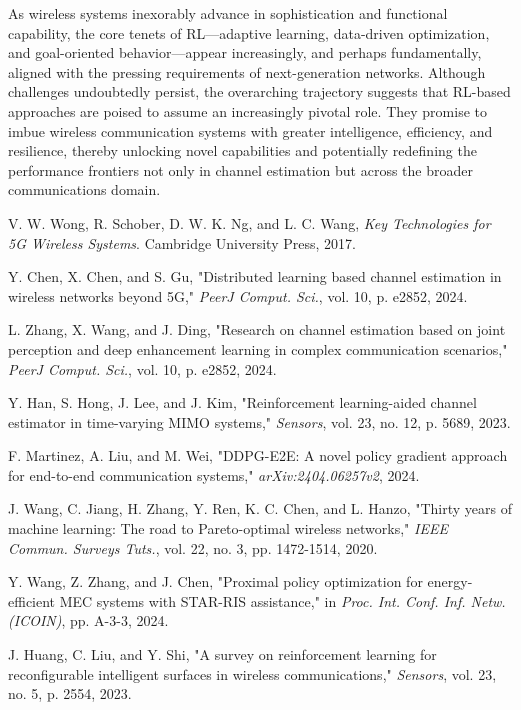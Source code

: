 \documentclass[journal,twocolumn]{IEEEtran}
\begin{document}
As wireless systems inexorably advance in sophistication and functional capability, the core tenets of RL—adaptive learning, data-driven optimization, and goal-oriented behavior—appear increasingly, and perhaps fundamentally, aligned with the pressing requirements of next-generation networks. Although challenges undoubtedly persist, the overarching trajectory suggests that RL-based approaches are poised to assume an increasingly pivotal role. They promise to imbue wireless communication systems with greater intelligence, efficiency, and resilience, thereby unlocking novel capabilities and potentially redefining the performance frontiers not only in channel estimation but across the broader communications domain.

\begin{thebibliography}{20} %

V. W. Wong, R. Schober, D. W. K. Ng, and L. C. Wang, \emph{Key Technologies for 5G Wireless Systems}. Cambridge University Press, 2017.

Y. Chen, X. Chen, and S. Gu, "Distributed learning based channel estimation in wireless networks beyond 5G," \emph{PeerJ Comput. Sci.}, vol. 10, p. e2852, 2024.

L. Zhang, X. Wang, and J. Ding, "Research on channel estimation based on joint perception and deep enhancement learning in complex communication scenarios," \emph{PeerJ Comput. Sci.}, vol. 10, p. e2852, 2024.

Y. Han, S. Hong, J. Lee, and J. Kim, "Reinforcement learning-aided channel estimator in time-varying MIMO systems," \emph{Sensors}, vol. 23, no. 12, p. 5689, 2023.

F. Martinez, A. Liu, and M. Wei, "DDPG-E2E: A novel policy gradient approach for end-to-end communication systems," \emph{arXiv:2404.06257v2}, 2024.

J. Wang, C. Jiang, H. Zhang, Y. Ren, K. C. Chen, and L. Hanzo, "Thirty years of machine learning: The road to Pareto-optimal wireless networks," \emph{IEEE Commun. Surveys Tuts.}, vol. 22, no. 3, pp. 1472-1514, 2020.

Y. Wang, Z. Zhang, and J. Chen, "Proximal policy optimization for energy-efficient MEC systems with STAR-RIS assistance," in \emph{Proc. Int. Conf. Inf. Netw. (ICOIN)}, pp. A-3-3, 2024.

J. Huang, C. Liu, and Y. Shi, "A survey on reinforcement learning for reconfigurable intelligent surfaces in wireless communications," \emph{Sensors}, vol. 23, no. 5, p. 2554, 2023.


\end{thebibliography}
\end{document}
